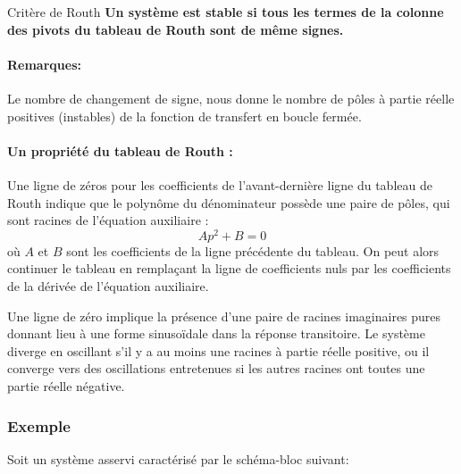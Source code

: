 \begin{criteria}{Critère de Routh}
    \textbf{Un système est stable si tous les termes de la colonne des pivots du tableau de Routh sont de même signes.}
\end{criteria}

\paragraph{Remarques:}
Le nombre de changement de signe, nous donne le nombre de pôles à partie réelle positives (instables)
de la fonction de transfert en boucle fermée.


\paragraph{Un propriété du tableau de Routh :}

Une ligne de zéros pour les coefficients de l'avant-dernière ligne du tableau de
Routh indique que le polynôme du dénominateur possède une paire de pôles, qui sont racines de l'équation auxiliaire :
$$
Ap^2+B=0
$$
où $A$ et $B$ sont les coefficients de la ligne précédente du tableau. On peut alors continuer le tableau en remplaçant la
ligne de coefficients nuls par les coefficients de la dérivée de l'équation auxiliaire.

Une ligne de zéro implique la présence d'une paire de racines imaginaires pures
donnant lieu à une forme sinuso\"idale dans la réponse transitoire.
Le système diverge en oscillant s'il y a au moins une racines à partie réelle positive,
ou il converge vers des oscillations entretenues si les autres racines ont toutes une partie réelle négative.



\subsubsection{Exemple}

Soit un système asservi caractérisé par le schéma-bloc suivant:

\begin{center}
\end{center}


